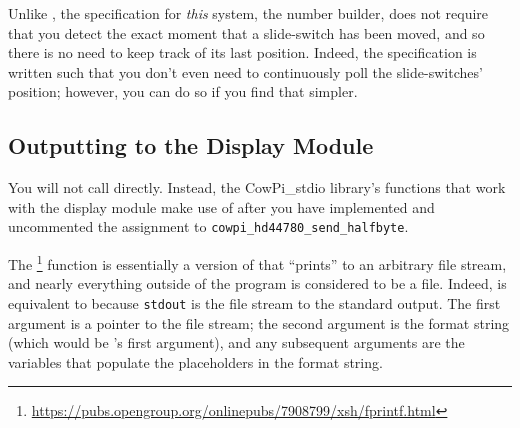 Unlike , the specification for \textit{this} system, the number builder, does not require that you detect the exact moment that a slide-switch has been moved, and so there is no need to keep track of its last position.
Indeed, the specification is written such that you don't even need to continuously poll the slide-switches' position;
however, you can do so if you find that simpler.


%
%


\subsection{Outputting to the Display Module} \label{subsec:numberBuilderOutput}

You will not call  directly.
Instead, the CowPi\_stdio library's functions that work with the display module make use of  after you have implemented and uncommented the assignment to \lstinline{cowpi_hd44780_send_halfbyte}.

The \footnote{\url{https://pubs.opengroup.org/onlinepubs/7908799/xsh/fprintf.html}} function is essentially a version of  that ``prints'' to an arbitrary file stream,
and nearly everything outside of the program is considered to be a file.
Indeed,  is equivalent to  because \lstinline{stdout} is the file stream to the standard output.
The first argument is a pointer to the file stream; the second argument is the format string (which would be 's first argument), and any subsequent arguments are the variables that populate the placeholders in the format string.

